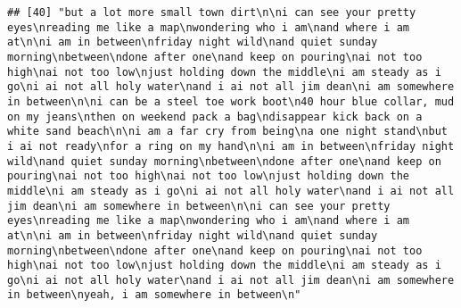 \documentclass[]{article}
\begin{document}
\begin{verbatim}
## [40] "but a lot more small town dirt\n\ni can see your pretty eyes\nreading me like a map\nwondering who i am\nand where i am at\n\ni am in between\nfriday night wild\nand quiet sunday morning\nbetween\ndone after one\nand keep on pouring\nai not too high\nai not too low\njust holding down the middle\ni am steady as i go\ni ai not all holy water\nand i ai not all jim dean\ni am somewhere in between\n\ni can be a steel toe work boot\n40 hour blue collar, mud on my jeans\nthen on weekend pack a bag\ndisappear kick back on a white sand beach\n\ni am a far cry from being\na one night stand\nbut i ai not ready\nfor a ring on my hand\n\ni am in between\nfriday night wild\nand quiet sunday morning\nbetween\ndone after one\nand keep on pouring\nai not too high\nai not too low\njust holding down the middle\ni am steady as i go\ni ai not all holy water\nand i ai not all jim dean\ni am somewhere in between\n\ni can see your pretty eyes\nreading me like a map\nwondering who i am\nand where i am at\n\ni am in between\nfriday night wild\nand quiet sunday morning\nbetween\ndone after one\nand keep on pouring\nai not too high\nai not too low\njust holding down the middle\ni am steady as i go\ni ai not all holy water\nand i ai not all jim dean\ni am somewhere in between\nyeah, i am somewhere in between\n"                                                                                                                                                                                                                                                                                                                                                                                                                                                                                                                                                                                                                                                                                                                                                                                                                                                                                                                                                                                                                                                                                                                                                                                                                                                                                                                                                                                                                                                                                                                                                                                                                           

\end{verbatim}
\end{document}
